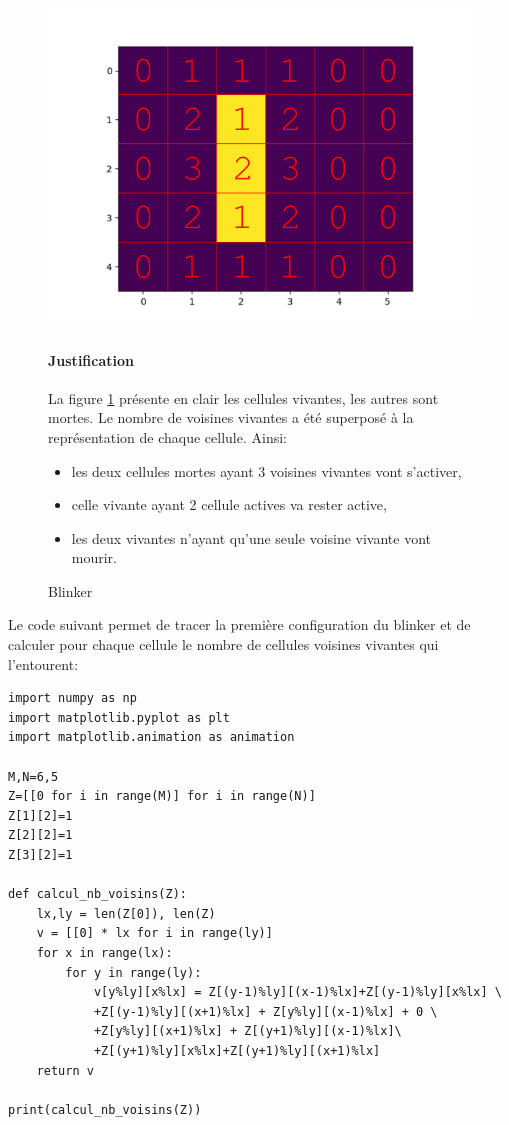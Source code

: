 \begin{figure}[ht!]
 \begin{minipage}{0.3\linewidth}
 \includegraphics[width=\linewidth]{img/blinker_num}
 \vspace{-1cm}
 \caption{\label{fig01} Blinker}
 \end{minipage}\hfill
 \begin{minipage}{0.68\linewidth}
 \paragraph{Justification} La figure \ref{fig01} présente en clair les cellules vivantes, les autres sont mortes. Le nombre de voisines vivantes a été superposé à la représentation de chaque cellule. Ainsi:
	\begin{itemize}
 		\item les deux cellules mortes ayant 3 voisines vivantes vont s'activer,
		\item celle vivante ayant 2 cellule actives va rester active,
		\item les deux vivantes n'ayant qu'une seule voisine vivante vont mourir.
	\end{itemize}
 \end{minipage}
\end{figure}

Le code suivant permet de tracer la première configuration du blinker et de calculer pour chaque cellule le nombre de cellules voisines vivantes qui l'entourent:
\begin{verbatim}
import numpy as np
import matplotlib.pyplot as plt
import matplotlib.animation as animation

M,N=6,5
Z=[[0 for i in range(M)] for i in range(N)]
Z[1][2]=1
Z[2][2]=1
Z[3][2]=1

def calcul_nb_voisins(Z):
    lx,ly = len(Z[0]), len(Z)
    v = [[0] * lx for i in range(ly)]
    for x in range(lx):
        for y in range(ly):
            v[y%ly][x%lx] = Z[(y-1)%ly][(x-1)%lx]+Z[(y-1)%ly][x%lx] \
            +Z[(y-1)%ly][(x+1)%lx] + Z[y%ly][(x-1)%lx] + 0 \
            +Z[y%ly][(x+1)%lx] + Z[(y+1)%ly][(x-1)%lx]\
            +Z[(y+1)%ly][x%lx]+Z[(y+1)%ly][(x+1)%lx]
    return v

print(calcul_nb_voisins(Z))
\end{verbatim}

